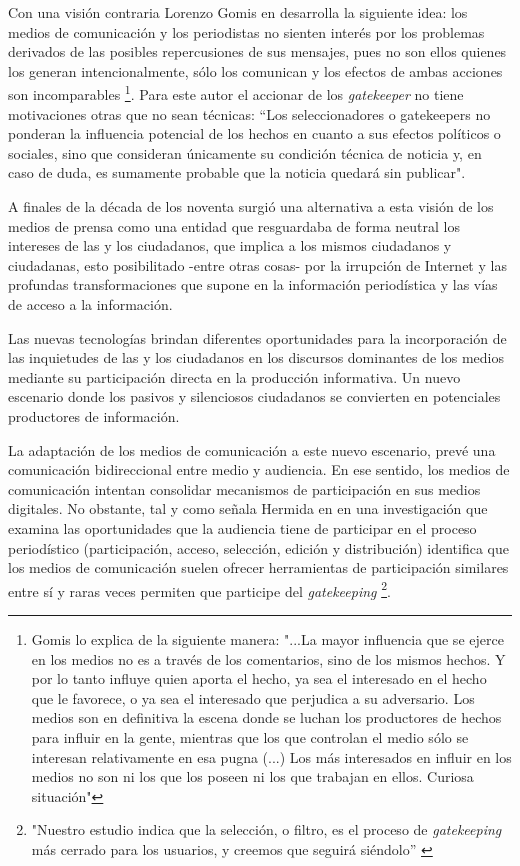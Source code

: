 Con una visión contraria Lorenzo Gomis en \cite{gomis1991teor} desarrolla la siguiente idea: los medios de comunicación y los periodistas no sienten interés por los problemas derivados de las posibles repercusiones de sus mensajes, pues no son ellos quienes los generan intencionalmente, sólo los comunican y los efectos de ambas acciones son incomparables \footnote{ Gomis lo explica de la siguiente manera: "...La mayor influencia que se ejerce en los medios no es a través de los comentarios, sino de los mismos hechos. Y por lo tanto influye quien aporta el hecho, ya sea el interesado en el hecho que le favorece, o ya sea el interesado que perjudica a su adversario. Los medios son en definitiva la escena donde se luchan los productores de hechos para influir en la gente, mientras que los que controlan el medio sólo se interesan relativamente en esa pugna (...) Los más interesados en influir en los medios no son ni los que los poseen ni los que trabajan en ellos. Curiosa situación"}. Para este autor el accionar de los \emph{gatekeeper} no tiene motivaciones otras que no sean técnicas: ``Los seleccionadores o gatekeepers no ponderan la influencia potencial de los hechos en cuanto a sus efectos políticos o sociales, sino que consideran únicamente su condición técnica de noticia y, en caso de duda, es sumamente probable que la noticia quedará sin publicar".

A finales de la década de los noventa surgió una alternativa a esta visión de los medios de prensa como una entidad que resguardaba de forma neutral los intereses de las y los ciudadanos, que implica a los mismos ciudadanos y ciudadanas, esto posibilitado -entre otras cosas- por la irrupción de Internet y las profundas transformaciones que supone en la información periodística y las vías de acceso a la información.

Las nuevas tecnologías brindan diferentes oportunidades para la incorporación de las inquietudes de las y los ciudadanos en los discursos dominantes de los medios mediante su participación directa en la producción informativa. Un nuevo escenario donde los pasivos y silenciosos ciudadanos se convierten en potenciales productores de información.

La adaptación de los medios de comunicación a este nuevo escenario, prevé una comunicación bidireccional entre medio y audiencia. En ese sentido, los medios de comunicación intentan consolidar mecanismos de participación en sus medios digitales. No obstante, tal y como señala Hermida en \cite{doi17512781003640703} en una investigación que examina las oportunidades que la audiencia tiene de participar en el proceso periodístico (participación, acceso, selección, edición y distribución) identifica que los medios de comunicación suelen ofrecer herramientas de participación similares entre sí y raras veces permiten que participe del \emph{gatekeeping} \footnote{"Nuestro estudio indica que la selección, o filtro, es el proceso de \emph{gatekeeping} más cerrado para los usuarios, y creemos que seguirá siéndolo” \cite{doi17512781003640703}}. %

